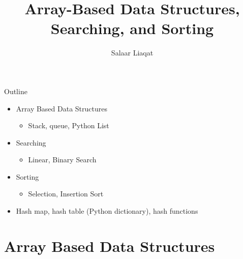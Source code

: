 \documentclass[
  ignorenonframetext,
]{beamer}
\title{Array-Based Data Structures, Searching, and Sorting}
\author{Salaar Liaqat}
\date{}
\institute{Data Sciences Institute, UofT}
\providecommand{\tightlist}{%
  \setlength{\itemsep}{0pt}\setlength{\parskip}{0pt}}\usepackage{longtable,booktabs,array}
\begin{document}
\frame{\titlepage}
\ifdefined\Shaded\renewenvironment{Shaded}{\begin{tcolorbox}[interior hidden, borderline west={3pt}{0pt}{shadecolor}, frame hidden, boxrule=0pt, breakable, sharp corners, enhanced]}{\end{tcolorbox}}\fi

\begin{frame}{Outline}
\protect\hypertarget{outline}{}
\begin{itemize}
\item
  Array Based Data Structures

  \begin{itemize}
  \tightlist
  \item
    Stack, queue, Python List
  \end{itemize}
\item
  Searching

  \begin{itemize}
  \tightlist
  \item
    Linear, Binary Search
  \end{itemize}
\item
  Sorting

  \begin{itemize}
  \tightlist
  \item
    Selection, Insertion Sort
  \end{itemize}
\item
  Hash map, hash table (Python dictionary), hash functions
\end{itemize}
\end{frame}

\hypertarget{array-based-data-structures}{%
\section{Array Based Data
Structures}\label{array-based-data-structures}}
\end{document}
